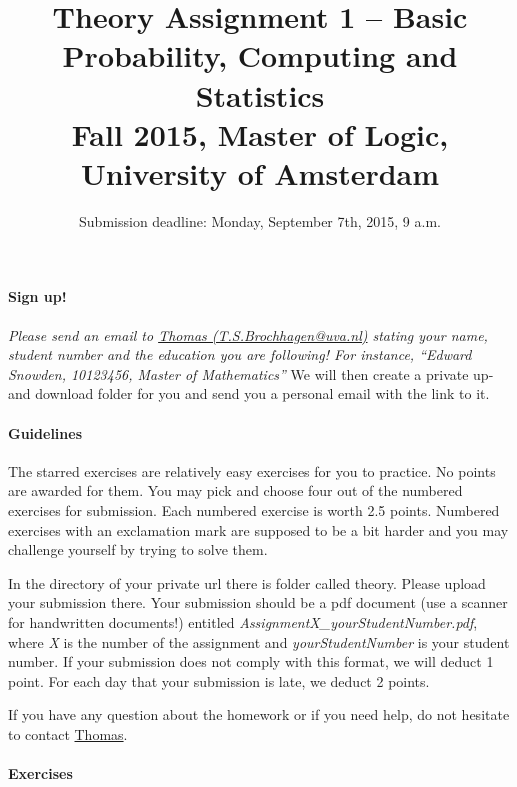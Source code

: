 \documentclass{article}
\title{Theory Assignment 1 -- Basic Probability, Computing and Statistics\\[2mm]
\large{Fall 2015, Master of Logic, University of Amsterdam}}
\author{}
\date{Submission deadline: Monday, September 7th, 2015, 9 a.m.}
\begin{document}
\maketitle

\paragraph{Sign up!} 
\emph{Please send an email to \href{mailto:}{Thomas (T.S.Brochhagen@uva.nl)} stating your name, student number and the education you are following! For instance, ``Edward Snowden, 10123456, Master of Mathematics''} We will then create a private up- and download folder for you and send you a personal email with the link to it.

\paragraph{Guidelines}
The starred exercises are relatively easy exercises for you to practice. No points are awarded for them. You may pick and choose four out of the numbered
exercises for submission. Each numbered exercise is worth 2.5 points. Numbered exercises with an exclamation mark are supposed to be a bit harder and you
may challenge yourself by trying to solve them.

In the directory of your private url there is folder called theory. Please upload your submission there. Your submission should be
a pdf document (use a scanner for handwritten documents!) entitled \textit{AssignmentX\_yourStudentNumber.pdf}, where \textit{X} is the number of the
assignment and \textit{yourStudentNumber} is your student number. If your submission does not comply with this format, we will deduct 1 point. For each day that
your submission is late, we deduct 2 points.

If you have any question about the homework or if you need help, do not hesitate to contact \href{mailto:T.S.Brochhagen@uva.nl}{Thomas}.

\paragraph{Exercises}
\end{document}
